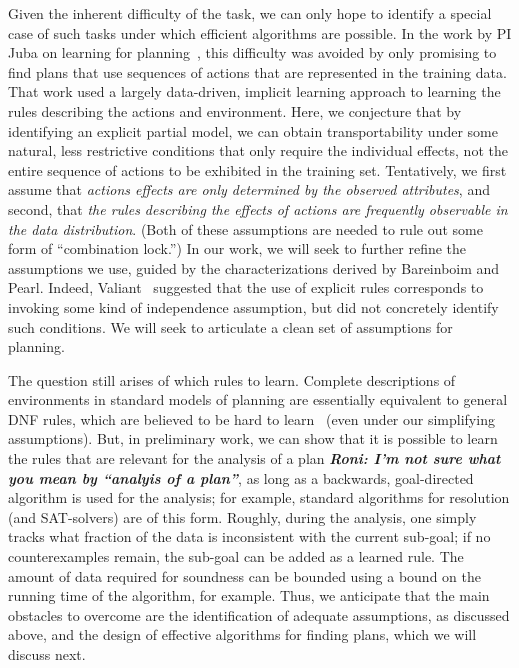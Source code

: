 \documentclass[12pt]{article}
\newcommand{\note}[1]{\textbf{\textit{#1}}}
\begin{document}
Given the inherent difficulty of the task, we can only hope to identify a special case of such tasks under which efficient algorithms are possible. In the work by PI Juba on learning for planning~\cite{juba2016jmlr}, this difficulty was avoided by only promising to find plans that use sequences of actions that are represented in the training data. That work used a largely data-driven, implicit learning approach to learning the rules describing the actions and environment. Here, we conjecture that by identifying an explicit partial model, we can obtain transportability under some natural, less restrictive conditions that only require the individual effects, not the entire sequence of actions to be exhibited in the training set. Tentatively, we first assume that {\em actions effects are only determined by the observed attributes}, and second, that {\em the rules describing the effects of actions are frequently observable in the data distribution}. (Both of these assumptions are needed to rule out some form of ``combination lock.'') In our work, we will seek to further refine the assumptions we use, guided by the characterizations derived by Bareinboim and Pearl. Indeed, Valiant~\cite{valiant2006knowledgeInfusion} suggested that the use of explicit rules corresponds to invoking some kind of independence assumption, but did not concretely identify such conditions. We will seek to articulate a clean set of assumptions for planning.

The question still arises of which rules to learn. Complete descriptions of environments in standard models of planning are essentially equivalent to general DNF rules, which are believed to be hard to learn~\cite{daniely2016dnf} (even under our simplifying assumptions). But, in preliminary work, we can show that it is possible to learn the rules that are relevant for the analysis of a plan \note{Roni: I'm not sure what you mean by ``analyis of a plan''}, as long as a backwards, goal-directed algorithm is used for the analysis; for example, standard algorithms for resolution (and SAT-solvers) are of this form. Roughly, during the analysis, one simply tracks what fraction of the data is inconsistent with the current sub-goal; if no counterexamples remain, the sub-goal can be added as a learned rule. The amount of data required for soundness can be bounded using a bound on the running time of the algorithm, for example. Thus, we anticipate that the main obstacles to overcome are the identification of adequate assumptions, as discussed above, and the design of effective algorithms for finding plans, which we will discuss next.
\end{document}
